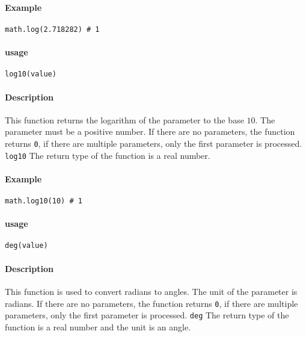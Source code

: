 \paragraph{Example}
\begin{lstlisting}[language=berry, numbers=none]
math.log(2.718282) # 1
\end{lstlisting}


\paragraph{usage}
\begin{lstlisting}[language=berry, numbers=none]
log10(value)
\end{lstlisting}

\paragraph{Description}
This function returns the logarithm of the parameter to the base $10$. The parameter must be a positive number. If there are no parameters, the function returns \texttt{0}, if there are multiple parameters, only the first parameter is processed. \texttt{log10} The return type of the function is a real number.

\paragraph{Example}
\begin{lstlisting}[language=berry, numbers=none]
math.log10(10) # 1
\end{lstlisting}


\paragraph{usage}
\begin{lstlisting}[language=berry, numbers=none]
deg(value)
\end{lstlisting}

\paragraph{Description}
This function is used to convert radians to angles. The unit of the parameter is radians. If there are no parameters, the function returns \texttt{0}, if there are multiple parameters, only the first parameter is processed. \texttt{deg} The return type of the function is a real number and the unit is an angle.


